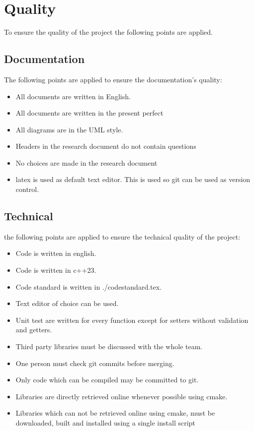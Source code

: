 \documentclass{article} %
\begin{document}
\newpage

\section{Quality}
To ensure the quality of the project the following points are applied.
\subsection{Documentation}
The following points are applied to ensure the documentation’s quality:
\begin{itemize}
    \item All documents are written in English.
    \item All documents are written in the present perfect
    \item All diagrams are in the UML style.
    \item Headers in the research document do not contain questions
    \item No choices are made in the research document
    \item latex is used as default text editor. This is used so git can be used as version control.
\end{itemize}
\subsection{Technical}
the following points are applied to ensure the technical quality of the project:
\begin{itemize}
    \item Code is written in english.
    \item Code is written in c++23.
    \item Code standard is written in ./codestandard.tex.
    \item Text editor of choice can be used.
    \item Unit test are written for every function except for setters without validation and getters.
    \item Third party libraries must be discussed with the whole team.
    \item One person must check git commits before merging.
    \item Only code which can be compiled may be committed to git.
    \item Libraries are directly retrieved online whenever possible using cmake.
    \item Libraries which can not be retrieved online using cmake, must be downloaded, built and installed using a single install script
\end{itemize}
\end{document}
